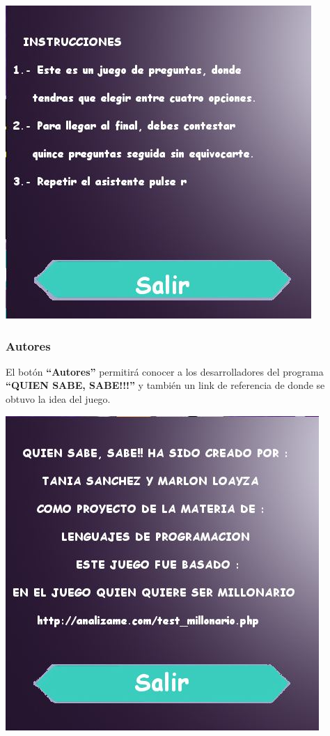 \documentclass[a4paper,11pt]{article}
\begin{document}
{		\begin{center}
			\includegraphics[scale=0.6]{images/instrucciones.jpg}
		\end{center}
	
		
\newpage

\subsubsection{Autores}

			El bot\'{o}n \textbf{``Autores''} permitir\'{a} conocer a los desarrolladores del programa \textbf{``QUIEN SABE, SABE!!!''} y tambi\'{e}n un link de referencia de donde se obtuvo la idea del juego.
			
	\begin{center}
		\includegraphics[scale=0.6]{images/autores.jpg} 
	\end{center}
		
}
\end{document}
